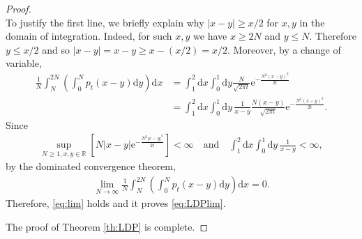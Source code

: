 \documentclass[10pt,a4paper]{amsart}
\newcommand{\R}{{\mathbb{R}}}
\newcommand{\e}{\mathrm{e}}
\renewcommand{\d}{\mathrm{d}}
\begin{document}
\begin{proof}
\begin{equation*}
\end{equation*}
To justify the first line, we briefly explain why $|x-y|\ge x/2$ for $x,y$ in 
the domain of integration.  
Indeed, for such $x,y$ we have $x\ge2N$ and $y\le N$.  Therefore $y\le x/2$ 
and so $|x-y|=x-y\ge x-(x/2)=x/2$.  
Moreover, by a change of variable, 
\begin{align*}
\frac1N\int^{2N}_N \left(\int_0^N p_t(x-y)\d y\right) \d x&=\int_1^2\d x \int_0^1 \d y \frac{N}{\sqrt{2\pi t}} \e^{-\frac{N^2(x-y)^2}{2t}}\\
&=\int_1^2\d x \int_0^1 \d y \, \frac1{x-y}\frac{N(x-y)}{\sqrt{2\pi t}} \e^{-\frac{N^2(x-y)^2}{2t}}.
\end{align*}
Since 
\begin{align*}
\sup_{N\geq1, x, y\in \R} \left[N|x-y|\e^{-\frac{N^2|x-y|^2}{2t}}\right]<\infty \quad \text{and}\quad \int_1^2\d x \int_0^1 \d y \, \frac1{x-y}<\infty,
\end{align*}
by the dominated convergence theorem, 
\begin{align*}
\lim_{N\to\infty}\frac1N\int^{2N}_N \left(\int_0^N p_t(x-y)\d y\right) \d x=0.
\end{align*}
Therefore,  \eqref{eq:lim} holds and it proves \eqref{eq:LDPlim}. 

The proof of Theorem \ref{th:LDP} is complete.
\end{proof}
\end{document}
